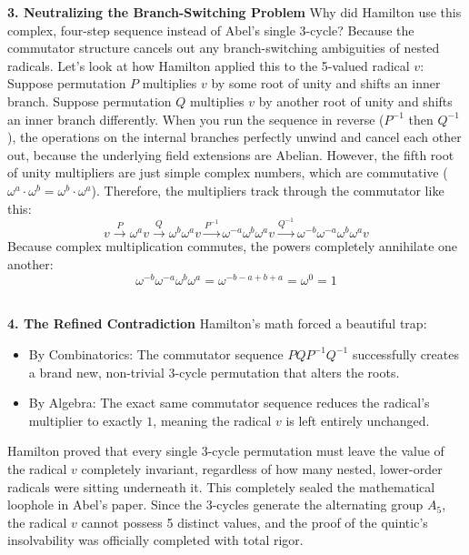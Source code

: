 {\bf 3. Neutralizing the Branch-Switching Problem}
Why did Hamilton use this complex, four-step sequence instead of Abel's single 3-cycle?
Because the commutator structure cancels out any branch-switching ambiguities of nested radicals.
Let's look at how Hamilton applied this to the 5-valued radical \(v\):
Suppose permutation \(P\) multiplies \(v\) by some root of unity and shifts an inner branch.
Suppose permutation \(Q\) multiplies \(v\) by another root of unity and shifts an inner branch differently.
When you run the sequence in reverse (\(P^{-1}\) then \(Q^{-1}\)), the operations on the internal branches perfectly unwind and cancel each other out, because the underlying field extensions are Abelian.
However, the fifth root of unity multipliers are just simple complex numbers, which are commutative (\(\omega^a \cdot \omega^b = \omega^b \cdot \omega^a\)).
Therefore, the multipliers track through the commutator like this:
\[v\xrightarrow{P}\omega ^{a}v\xrightarrow{Q}\omega ^{b}\omega ^{a}v\xrightarrow{P^{-1}}\omega ^{-a}\omega ^{b}\omega ^{a}v\xrightarrow{Q^{-1}}\omega ^{-b}\omega ^{-a}\omega ^{b}\omega ^{a}v\]
Because complex multiplication commutes, the powers completely annihilate one another:
\[\omega ^{-b}\omega ^{-a}\omega ^{b}\omega ^{a}=\omega ^{-b-a+b+a}=\omega ^{0}=1\]\

{\bf 4. The Refined Contradiction}
Hamilton's math forced a beautiful trap: 
\begin{itemize}
\item[]By Combinatorics: The commutator sequence \(P Q P^{-1} Q^{-1}\) successfully creates a brand new, non-trivial 3-cycle permutation that alters the roots.
\item[]By Algebra: The exact same commutator sequence reduces the radical's multiplier to exactly \(1\), meaning the radical \(v\) is left entirely unchanged.
\end{itemize}
Hamilton proved that every single 3-cycle permutation must leave the value of the radical \(v\) completely invariant, regardless of how many nested, lower-order radicals were sitting underneath it.
This completely sealed the mathematical loophole in Abel's paper. 
Since the 3-cycles generate the alternating group \(A_{5}\), the radical \(v\) cannot possess 5 distinct values, and the proof of the quintic's insolvability was officially completed with total rigor.\\


